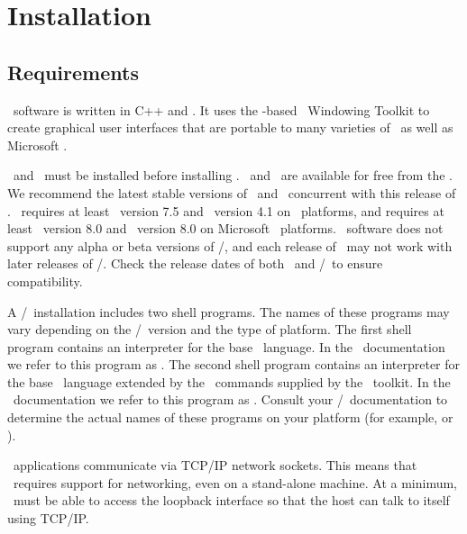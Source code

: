\section{Installation}\label{sec:install}

\subsection{Requirements}\label{sec:install.requirements}
\OOMMF\ software is written in C++ and \Tcl.  It uses the \Tcl-based
\Tk\ Windowing Toolkit to create graphical user interfaces that are
portable to many varieties of \Unix\ as well as Microsoft 
\Windows.  

\Tcl\ and \Tk\ must be installed before installing \OOMMF.  
\Tcl\ and \Tk\ are available for free from the
.
We recommend the latest stable 
versions of \Tcl\ and \Tk\ concurrent with this release of \OOMMF.
\OOMMF\ requires
at least \Tcl\ version 7.5 and \Tk\ version 4.1 
on \Unix\ platforms, and requires at least \Tcl\ version 8.0 and 
\Tk\ version 8.0 on Microsoft \Windows\ platforms.  \OOMMF\ software 
does not support any alpha or beta versions of \Tcl/\Tk, and 
each release of \OOMMF\ may not work with later releases of
\Tcl/\Tk.  Check the release dates of both \OOMMF\ and
\Tcl/\Tk\ to ensure compatibility.

A \Tcl/\Tk\ installation includes two shell programs.  The names of 
these programs may vary depending on the \Tcl/\Tk\ version and the 
type of platform.  The first shell program contains an interpreter 
for the base \Tcl\ language.  In the \OOMMF\ documentation we refer 
to this program as .  
The second shell program contains 
an interpreter for the base \Tcl\ language extended by the 
\Tcl\ commands supplied by the \Tk\ toolkit.  In the 
\OOMMF\ documentation we refer to this program as 
.  
Consult your \Tcl/\Tk\ documentation to determine 
the actual names of these programs on your platform (for example, 
 or ).

\OOMMF\ applications communicate via TCP/IP network sockets.
This means that \OOMMF\ requires
support for networking, even 
on a stand-alone machine.  At a minimum, \OOMMF\ must be able to 
access the loopback interface so that the host can talk to 
itself using TCP/IP.

